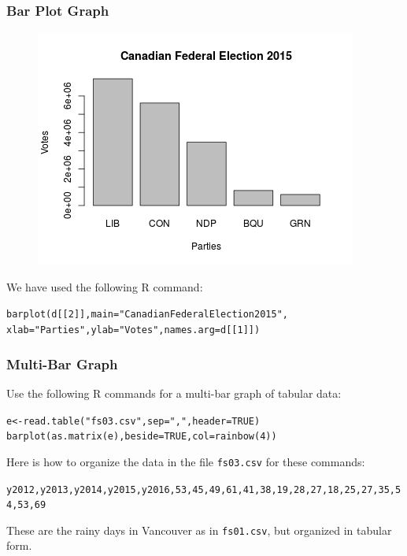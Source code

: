 \documentclass[xcolor=dvipsnames]{beamer}
\begin{document}
\begin{frame}
  \frametitle{Bar Plot Graph}
\begin{figure}[h]
\includegraphics[scale=.5]{./barplot.png}
\end{figure}
We have used the following R command: 
\begin{alltt}
\small
barplot(d[[2]], main="Canadian Federal Election 2015",\newline
xlab="Parties",ylab="Votes",names.arg=d[[1]])
\end{alltt}
\end{frame}

\begin{frame}
  \frametitle{Multi-Bar Graph}
Use the following R commands for a multi-bar graph of tabular data: 
\begin{alltt}
\small
e<-read.table("fs03.csv",sep=",",header=TRUE)\newline
barplot(as.matrix(e),beside=TRUE,col=rainbow(4))
\end{alltt}
Here is how to organize the data in the file \texttt{fs03.csv} for these commands:
\begin{alltt}
\small
y2012,y2013,y2014,y2015,y2016,53,45,49,61,41,38,19,28,27,18,25,27,35,54,53,69
\end{alltt}
These are the rainy days in Vancouver as in \texttt{fs01.csv}, but
organized in tabular form.
\end{frame}
\end{document}
